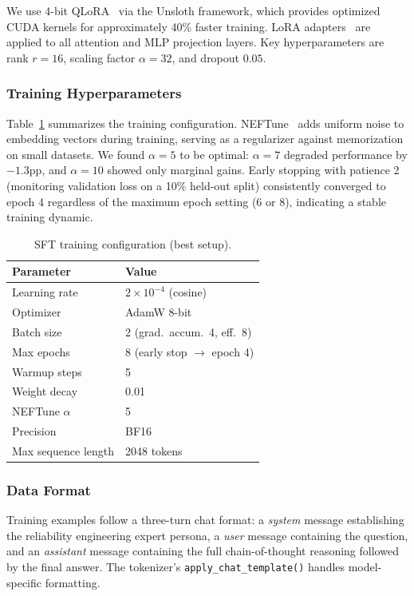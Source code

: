 We use 4-bit QLoRA~\cite{dettmers2023qlora} via the Unsloth framework, which provides optimized CUDA kernels for approximately 40\% faster training. LoRA adapters~\cite{hu2022lora} are applied to all attention and MLP projection layers. Key hyperparameters are rank $r=16$, scaling factor $\alpha=32$, and dropout $0.05$.

\subsubsection{Training Hyperparameters}

Table~\ref{tab:training_config} summarizes the training configuration. NEFTune~\cite{jain2023neftune} adds uniform noise to embedding vectors during training, serving as a regularizer against memorization on small datasets. We found $\alpha=5$ to be optimal: $\alpha=7$ degraded performance by $-1.3$pp, and $\alpha=10$ showed only marginal gains. Early stopping with patience 2 (monitoring validation loss on a 10\% held-out split) consistently converged to epoch 4 regardless of the maximum epoch setting (6 or 8), indicating a stable training dynamic.

\begin{table}[t]
\centering
\small
\caption{SFT training configuration (best setup).}
\label{tab:training_config}
\begin{tabular}{@{}ll@{}}
\toprule
Parameter & Value \\
\midrule
Learning rate & $2 \times 10^{-4}$ (cosine) \\
Optimizer & AdamW 8-bit \\
Batch size & 2 (grad.\ accum.\ 4, eff.\ 8) \\
Max epochs & 8 (early stop $\to$ epoch 4) \\
Warmup steps & 5 \\
Weight decay & 0.01 \\
NEFTune $\alpha$ & 5 \\
Precision & BF16 \\
Max sequence length & 2048 tokens \\
\bottomrule
\end{tabular}
\end{table}

\subsubsection{Data Format}

Training examples follow a three-turn chat format: a \emph{system} message establishing the reliability engineering expert persona, a \emph{user} message containing the question, and an \emph{assistant} message containing the full chain-of-thought reasoning followed by the final answer. The tokenizer's \texttt{apply\_chat\_template()} handles model-specific formatting.

